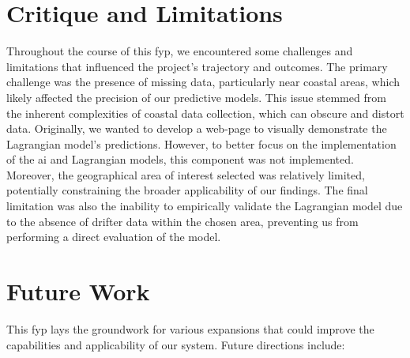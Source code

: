 \section{Critique and Limitations}
\label{sec:5.2}

Throughout the course of this \acrshort{fyp}, we encountered some challenges and limitations that influenced the project's trajectory and outcomes. The primary challenge was the presence of missing data, particularly near coastal areas, which likely affected the precision of our predictive models. This issue stemmed from the inherent complexities of coastal data collection, which can obscure and distort data. Originally, we wanted to develop a web-page to visually demonstrate the Lagrangian model's predictions. However, to better focus on the implementation of the \acrshort{ai} and Lagrangian models, this component was not implemented. Moreover, the geographical area of interest selected was relatively limited, potentially constraining the broader applicability of our findings. The final limitation was also the inability to empirically validate the Lagrangian model due to the absence of drifter data within the chosen area, preventing us from performing a direct evaluation of the model.

\section{Future Work}
\label{sec:5.3}

This \acrshort{fyp} lays the groundwork for various expansions that could improve the capabilities and applicability of our system. Future directions include:

